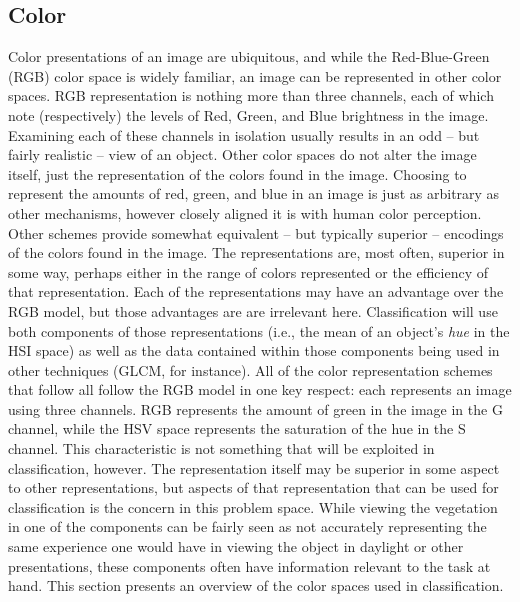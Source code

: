 \documentclass[letterpaper]{report}
\begin{document}
\subsection{Color}
Color presentations of an image are ubiquitous, and while the Red-Blue-Green (RGB) color space is widely familiar, an image can be represented in other color spaces. RGB representation is nothing more than three channels, each of which note (respectively) the levels of Red, Green, and Blue brightness in the image.  Examining each of these channels in isolation usually results in an odd -- but fairly realistic -- view of an object. Other color spaces do not alter the image itself, just the representation of the colors found in the image.  Choosing to represent the amounts of red, green, and blue in an image is just as arbitrary as other mechanisms, however closely aligned it is with human color perception. Other schemes provide somewhat equivalent -- but typically superior -- encodings of the colors found in the image. The representations are, most often, superior in some way, perhaps either in the range of colors represented or the efficiency of that representation. Each of the representations may have an advantage over the RGB model, but those advantages are are irrelevant  here. Classification will use both components of those representations (i.e., the mean of an object's \textit{hue} in the HSI space) as well as the data contained within those components being used in other techniques (GLCM, for instance). All of the color representation schemes that follow all follow the RGB model in one key respect: each represents an image using three channels. RGB represents the amount of green in the image in the G channel, while the HSV space represents the saturation of the hue in the S channel. This characteristic is not something that will be exploited in classification, however. The representation itself may be superior in some aspect to other representations, but aspects of that representation that can be used for classification is the concern in this problem space. While viewing the vegetation in one of the components can be fairly seen as not accurately representing the same experience one would have in viewing the object in daylight or other presentations, these components often have information relevant to the task at hand. This section presents an overview of the color spaces used in classification.
\end{document}
